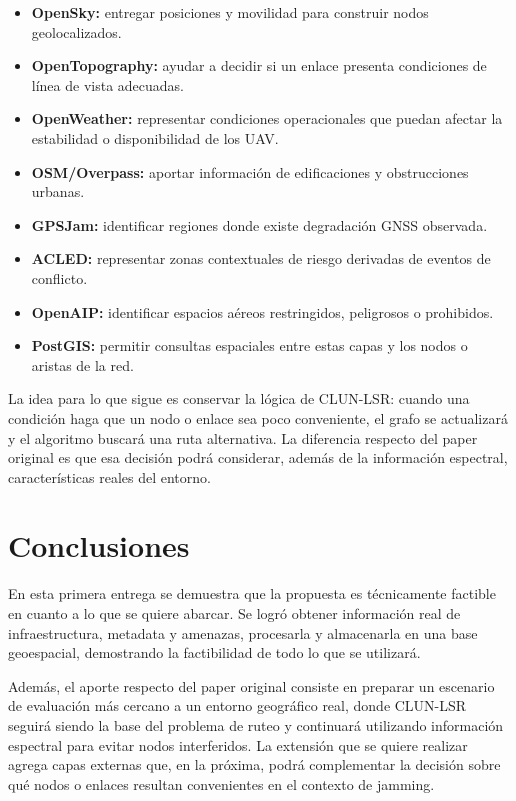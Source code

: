 \documentclass[journal,10pt]{IEEEtran}
\begin{document}
\begin{itemize}
    \item \textbf{OpenSky:} entregar posiciones y movilidad para construir nodos geolocalizados.
    \item \textbf{OpenTopography:} ayudar a decidir si un enlace presenta condiciones de línea de
    vista adecuadas.
    \item \textbf{OpenWeather:} representar condiciones operacionales que puedan afectar la
    estabilidad o disponibilidad de los UAV.
    \item \textbf{OSM/Overpass:} aportar información de edificaciones y obstrucciones urbanas.
    \item \textbf{GPSJam:} identificar regiones donde existe degradación GNSS observada.
    \item \textbf{ACLED:} representar zonas contextuales de riesgo derivadas de eventos de
    conflicto.
    \item \textbf{OpenAIP:} identificar espacios aéreos restringidos, peligrosos o prohibidos.
    \item \textbf{PostGIS:} permitir consultas espaciales entre estas capas y los nodos o
    aristas de la red.
\end{itemize}

La idea para lo que sigue es conservar la lógica de CLUN-LSR: cuando una condición haga
que un nodo o enlace sea poco conveniente, el grafo se actualizará y el algoritmo buscará una
ruta alternativa. La diferencia respecto del paper original es que esa decisión podrá considerar,
además de la información espectral, características reales del entorno.
\section{Conclusiones}

En esta primera entrega se demuestra que la propuesta es técnicamente factible en cuanto a lo que se quiere abarcar. Se logró obtener
información real de infraestructura, metadata y amenazas, procesarla y almacenarla en una base
geoespacial, demostrando la factibilidad de todo lo que se utilizará.

Además, el aporte respecto del paper original consiste en preparar un escenario de evaluación más cercano
a un entorno geográfico real, donde CLUN-LSR seguirá siendo la base del problema de ruteo y continuará
utilizando información espectral para evitar nodos interferidos. La extensión que se quiere realizar agrega
capas externas que, en la próxima, podrá complementar la decisión sobre qué nodos o
enlaces resultan convenientes en el contexto de jamming.
\end{document}
